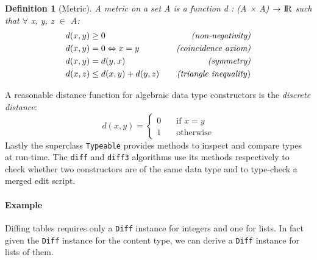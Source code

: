 \documentclass{sigplanconf}
\theoremstyle{plain}
\newtheorem{definition}{Definition}
\begin{document}
\begin{definition}[Metric]
\label{par:Metric}
A metric on a set A is a function
d : (A × A) → ${\rm I\!R}$ such that $\forall$ x, y, z $\in$ A:
	\begin{align*}
		d(x, y) &\geq 0 \quad &\mbox{\emph{{(non-negativity)}}}\\ 
		d(x, y) &= 0 \Leftrightarrow x = y \quad &\mbox{\emph{(coincidence axiom)}} \\		
		d(x, y) &= d(y, x) \quad &\mbox{\emph{(symmetry)}}\\
		d(x, z) &\leq d(x, y) + d(y, z) \quad &\mbox{\emph{(triangle inequality})}
	\end{align*}
	
\end{definition}
A reasonable distance function for algebraic
data type constructors is the \emph{discrete distance}:
	\[ d(x, y) = 
		\begin{cases} 
			0 \quad &\mbox{if } x = y \\
			1 \quad &\mbox {otherwise}		
		\end{cases} \]	
%
Lastly the superclass \texttt{Typeable} provides methods to inspect and
compare types at run-time.
The \texttt{diff} and \texttt{diff3} algorithms use its methods respectively 
to check whether two constructors are of the same data type
and to type-check a merged edit script.

\paragraph{Example}
Diffing tables requires only a \texttt{Diff} instance for integers
and one for lists.
In fact given the \texttt{Diff} instance for the content type, we can
derive a \texttt{Diff} instance for lists of them.
\end{document}
